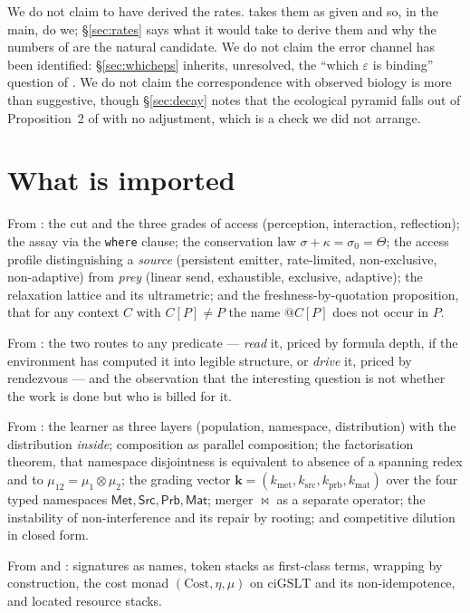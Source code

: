 \documentclass[11pt]{article}
\theoremstyle{plain}
\theoremstyle{definition}
\theoremstyle{remark}
\newcommand{\Met}{\mathsf{Met}}
\newcommand{\Src}{\mathsf{Src}}
\newcommand{\Prb}{\mathsf{Prb}}
\newcommand{\Mat}{\mathsf{Mat}}
\newcommand{\Merge}{\bowtie}
\begin{document}
We do not claim to have derived the rates. \cite{vtok} takes them as given
and so, in the main, do we; \S\ref{sec:rates} says what it would take to
derive them and why the numbers of \cite{game} are the natural candidate.
We do not claim the error channel has been identified: \S\ref{sec:whicheps}
inherits, unresolved, the ``which $\varepsilon$ is binding'' question of
\cite{compaut}. We do not claim the correspondence with observed biology is
more than suggestive, though \S\ref{sec:decay} notes that the ecological
pyramid falls out of Proposition~2 of \cite{vtok} with no adjustment, which
is a check we did not arrange.

\section{What is imported}

From \cite{scientist}: the cut and the three grades of access (perception,
interaction, reflection); the assay via the \texttt{where} clause; the
conservation law $\sigma + \kappa = \sigma_0 = \Theta$; the access profile
distinguishing a \emph{source} (persistent emitter, rate-limited,
non-exclusive, non-adaptive) from \emph{prey} (linear send, exhaustible,
exclusive, adaptive); the relaxation lattice and its ultrametric; and the
freshness-by-quotation proposition, that for any context $C$ with
$C[P] \neq P$ the name $@C[P]$ does not occur in $P$.

From \cite{game}: the two routes to any predicate --- \emph{read} it,
priced by formula depth, if the environment has computed it into legible
structure, or \emph{drive} it, priced by rendezvous --- and the observation
that the interesting question is not whether the work is done but who is
billed for it.

From \cite{compose}: the learner as three layers (population, namespace,
distribution) with the distribution \emph{inside}; composition as parallel
composition; the factorisation theorem, that namespace disjointness is
equivalent to absence of a spanning redex and to $\mu_{12} =
\mu_1 \otimes \mu_2$; the grading vector
$\mathbf{k} = (k_{\mathrm{met}}, k_{\mathrm{src}}, k_{\mathrm{prb}},
k_{\mathrm{mat}})$ over the four typed namespaces $\Met, \Src, \Prb, \Mat$;
merger $\Merge$ as a separate operator; the instability of non-interference
and its repair by rooting; and competitive dilution in closed form.

From \cite{CARho} and \cite{CE}: signatures as names, token stacks as
first-class terms, wrapping by construction, the cost monad
$(\mathrm{Cost}, \eta, \mu)$ on $\mathrm{ciGSLT}$ and its non-idempotence,
and located resource stacks.
\end{document}
